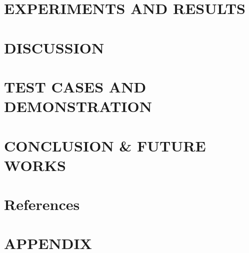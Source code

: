 \documentclass[12pt, twoside]{report}
\makeatletter
\newcommand\AppendixName{Appendix}
\let\oldappendix\appendix
\renewcommand{\appendix}{%
  \oldappendix
  \renewcommand{\chaptername}{\AppendixName}
  \renewcommand{\thechapter}{\@Alph\c@chapter}}
\makeatother
\begin{document}
\chapter{EXPERIMENTS AND RESULTS}


\chapter{DISCUSSION}


\chapter{TEST CASES AND DEMONSTRATION}


\chapter{CONCLUSION \& FUTURE WORKS}


\chapter*{References}


\appendix
\chapter*{APPENDIX}

\end{document}
